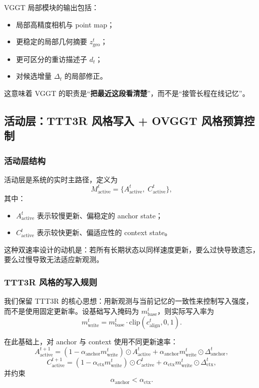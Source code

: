 \documentclass[12pt]{article}
\begin{document}
VGGT 局部模块的输出包括：
\begin{itemize}
  \item 局部高精度相机与 point map；
  \item 更稳定的局部几何摘要 $z_{\text{geo}}^t$；
  \item 更可区分的重访描述子 $d_t$；
  \item 对候选增量 $\Delta_t$ 的局部修正。
\end{itemize}

这意味着 VGGT 的职责是“\textbf{把最近这段看清楚}”，而不是“接管长程在线记忆”。

\subsection{活动层：TTT3R 风格写入 + OVGGT 风格预算控制}

\subsubsection{活动层结构}

活动层是系统的实时主路径，定义为
\begin{equation}
M_{\text{active}}^t = \{A_{\text{active}}^t,\; C_{\text{active}}^t\},
\end{equation}
其中：
\begin{itemize}
  \item $A_{\text{active}}^t$ 表示较慢更新、偏稳定的 anchor state；
  \item $C_{\text{active}}^t$ 表示较快更新、偏适应性的 context state。
\end{itemize}

这种双速率设计的动机是：若所有长期状态以同样速度更新，要么过快导致遗忘，要么过慢导致无法适应新观测。

\subsubsection{TTT3R 风格的写入规则}

我们保留 TTT3R 的核心思想：用新观测与当前记忆的一致性来控制写入强度，而不是使用固定更新率。设基础写入掩码为 $m_{\text{base}}^t$，则实际写入率为
\begin{equation}
m_{\text{write}}^t = m_{\text{base}}^t \cdot \mathrm{clip}(c_{\text{align}}^t, 0, 1).
\end{equation}

在此基础上，对 anchor 与 context 使用不同更新速率：
\begin{equation}
A_{\text{active}}^{t+1} = (1-\alpha_{\text{anchor}}m_{\text{write}}^t)\odot A_{\text{active}}^t + \alpha_{\text{anchor}}m_{\text{write}}^t \odot \Delta_{\text{anchor}}^t,
\end{equation}
\begin{equation}
C_{\text{active}}^{t+1} = (1-\alpha_{\text{ctx}}m_{\text{write}}^t)\odot C_{\text{active}}^t + \alpha_{\text{ctx}}m_{\text{write}}^t \odot \Delta_{\text{ctx}}^t,
\end{equation}
并约束
\begin{equation}
\alpha_{\text{anchor}} < \alpha_{\text{ctx}}.
\end{equation}
\end{document}
